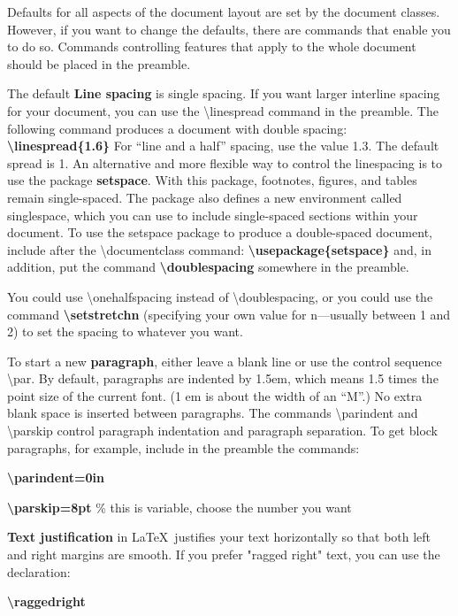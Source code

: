 \documentclass[12pt,openright]{book}
\begin{document}
Defaults for all aspects of the document layout are set by the document classes. However, if you want to change the defaults, there are commands that enable you to do so. Commands controlling features that apply to the whole document should be placed in
the preamble.

The default \textbf{Line spacing} is single spacing. If you want larger interline spacing for your document, you can use the \textbackslash linespread command in the preamble. The following command produces a document with double spacing: \textbf{\textbackslash linespread\{1.6\}} For “line and a half” spacing, use the value 1.3. The default spread is 1. An alternative and more flexible way to control the linespacing is to use the package \textbf{setspace}. With this package, footnotes, figures, and tables remain single-spaced. The package also defines a new environment called singlespace, which you can use to include single-spaced sections within your document. To use the setspace package to produce a double-spaced document, include after the \textbackslash documentclass command: \textbf{\textbackslash usepackage\{setspace\}} and, in addition, put the command \textbf{\textbackslash doublespacing} somewhere in the preamble.

You could use \textbackslash onehalfspacing instead of \textbackslash doublespacing, or you could use the command \textbf{\textbackslash setstretch{n}} (specifying your own value for n—usually between 1 and 2) to set the spacing to whatever you want.

To start a new \textbf{paragraph}, either leave a blank line or use the control sequence \textbackslash par. By default, paragraphs are indented by 1.5em, which means 1.5 times the point size of the current font. (1 em is about the width of an “M”.) No extra blank space is inserted between paragraphs. The commands \textbackslash parindent and \textbackslash parskip control paragraph indentation and paragraph separation. To get block paragraphs, for example, include in the preamble the commands: 

\textbf{\textbackslash parindent=0in} 

\textbf{\textbackslash parskip=8pt} \% this is variable, choose the number you want

\textbf{Text justification} in \LaTeX\ justifies your text horizontally so that both left and right margins are smooth. If you prefer "ragged right" text, you can use the declaration:

\textbf{\textbackslash raggedright}
\end{document}
